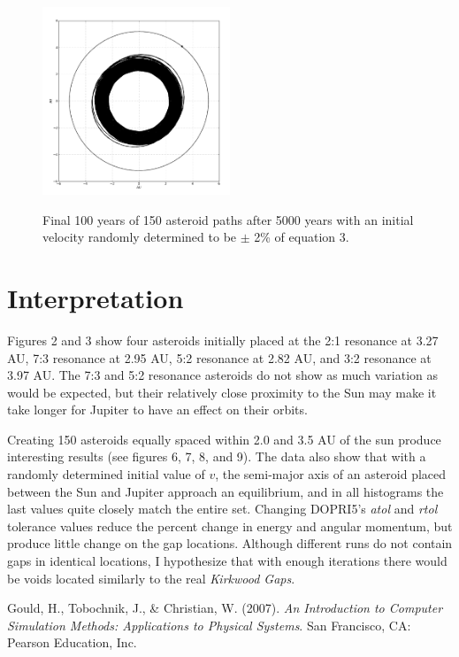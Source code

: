 \documentclass{article}%
\begin{document}
\begin{figure}[H]
	\centering
		\includegraphics[width=0.50\textwidth]{images/edits/output100ast5000yr.png}
	\label{fig:150 asteroid orbits}
	\caption{Final 100 years of 150 asteroid paths after 5000 years with an initial 
	         velocity randomly determined to be $\pm$ 2\% of equation 3.}
\end{figure}
\onecolumn
\twocolumn

\section{Interpretation}

Figures 2 and 3 show four asteroids initially placed at the 2:1 resonance at 3.27 AU, 7:3 resonance at 2.95 AU, 5:2 resonance at 2.82 AU, and 3:2 resonance at 3.97 AU. The 7:3 and 5:2 resonance asteroids do not show as much variation as would be expected, but their relatively close proximity to the Sun may make it take longer for Jupiter to have an effect on their orbits.

Creating 150 asteroids equally spaced within 2.0 and 3.5 AU of the sun produce interesting results (see figures 6, 7, 8, and 9).  The data also show that with a randomly determined initial value of $v$, the semi-major axis of an asteroid placed between the Sun and Jupiter approach an equilibrium, and in all histograms the last values quite closely match the entire set.  Changing DOPRI5's \emph{atol} and \emph{rtol} tolerance values reduce the percent change in energy and angular momentum, but produce little change on the gap locations.  Although different runs do not contain gaps in identical locations, I hypothesize that with enough iterations there would be voids located similarly to the real \emph{Kirkwood Gaps}.

\begin{thebibliography}{1}
	Gould, H., Tobochnik, J., \& Christian, W. (2007). \textit{An Introduction to Computer Simulation Methods: Applications to Physical Systems}. San Francisco, CA: Pearson Education, Inc.
\end{thebibliography} 
\end{document}
